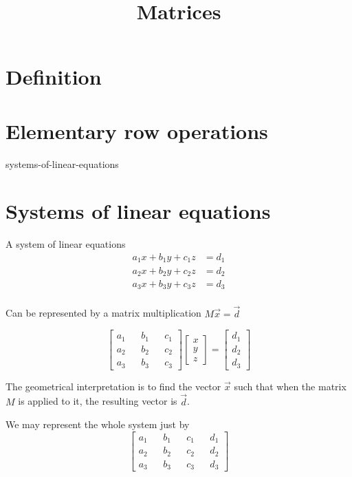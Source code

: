 \documentclass[preview]{standalone}
\begin{document}
\title{Matrices}
\genpage

\section{Definition}



\section{Elementary row operations}


\begin{snippet}{systems-of-linear-equations}
\section{Systems of linear equations}

A system of linear equations
\begin{align*}
    a_1x + b_1y + c_1z &= d_1 \\
    a_2x + b_2y + c_2z &= d_2 \\
    a_3x + b_3y + c_3z &= d_3 \\
\end{align*}

Can be represented by a matrix multiplication \(M\vec{x}=\vec{d}\)

\[
    \begin{bmatrix} 
        a_1 && b_1 && c_1 \\
        a_2 && b_2 && c_2 \\
        a_3 && b_3 && c_3
    \end{bmatrix}
    \begin{bmatrix}
        x \\ y \\ z
    \end{bmatrix}
    =
    \begin{bmatrix}
        d_1 \\ d_2 \\ d_3
    \end{bmatrix}
\]

The geometrical interpretation is to find the vector \(\vec{x}\)
such that when the matrix \(M\) is applied to it, the resulting vector is \(\vec{d}\).

We may represent the whole system just by
\[
    \begin{bmatrix} 
        a_1 && b_1 && c_1 && d_1 \\
        a_2 && b_2 && c_2 && d_2 \\
        a_3 && b_3 && c_3 && d_3
    \end{bmatrix}
\]
\end{snippet}
\end{document}
